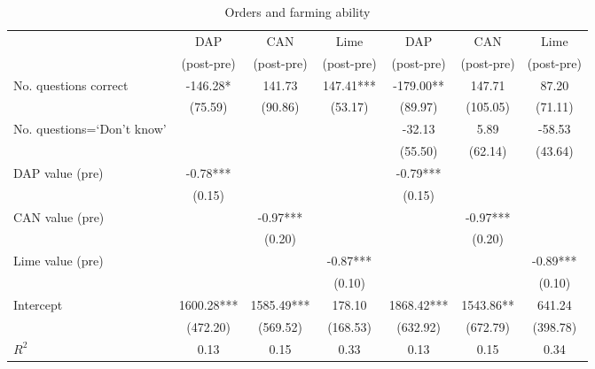 \begin{table}[htbp]
\centering
\hspace*{-1.2cm}
\begin{threeparttable}
\caption{Orders and farming ability}
\label{tab:c2order}
\begin{tabular}{l cccccc}
\hline
\hline
& DAP & CAN & Lime & DAP & CAN & Lime \\
& (post-pre) & (post-pre)& (post-pre) & (post-pre) & (post-pre) & (post-pre) \\ \hline
No. questions correct&     -146.28*  &      141.73   &      147.41***&     -179.00** &      147.71   &       87.20   \\
                    &     (75.59)   &     (90.86)   &     (53.17)   &     (89.97)   &    (105.05)   &     (71.11)   \\
No. questions=‘Don’t know’&               &               &               &      -32.13   &        5.89   &      -58.53   \\
                    &               &               &               &     (55.50)   &     (62.14)   &     (43.64)   \\
DAP value (pre)     &       -0.78***&               &               &       -0.79***&               &               \\
                    &      (0.15)   &               &               &      (0.15)   &               &               \\
CAN value (pre)     &               &       -0.97***&               &               &       -0.97***&               \\
                    &               &      (0.20)   &               &               &      (0.20)   &               \\
Lime value (pre)    &               &               &       -0.87***&               &               &       -0.89***\\
                    &               &               &      (0.10)   &               &               &      (0.10)   \\
Intercept           &     1600.28***&     1585.49***&      178.10   &     1868.42***&     1543.86** &      641.24   \\
                    &    (472.20)   &    (569.52)   &    (168.53)   &    (632.92)   &    (672.79)   &    (398.78)   \\
\hline
$R^2$               &        0.13   &        0.15   &        0.33   &        0.13   &        0.15   &        0.34   \\

\end{tabular}
\end{threeparttable}
\end{table}
